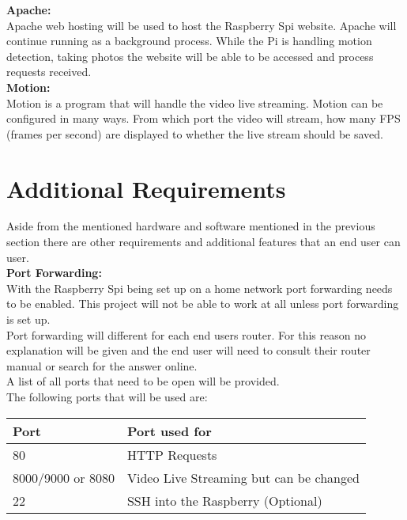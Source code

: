 \documentclass[]{report}
\begin{document}
\noindent
{\bf Apache:}\\
\break
Apache web hosting will be used to host the Raspberry Spi website. Apache will continue running as a background process. While the Pi is handling motion detection, taking photos the website will be able to be accessed and process requests received.\\ 

\noindent
{\bf Motion:}\\
\break
Motion is a program that will handle the video live streaming. Motion can be configured in many ways. From which port the video will stream, how many FPS (frames per second) are displayed to whether the live stream should be saved.\\

\clearpage
\section{Additional Requirements}	
\label{sec:additional}
Aside from the mentioned hardware and software mentioned in the previous section there are other requirements and additional features that an end user can user.\\

\noindent
{\bf Port Forwarding:}\\
\break
With the Raspberry Spi being set up on a home network port forwarding needs to be enabled. This project will not be able to work at all unless port forwarding is set up.\\

Port forwarding will different for each end users router. For this reason no explanation will be given and the end user will need to consult their router manual or search for the answer online. \\

A list of all ports that need to be open will be provided. \\

The following ports that will be used are:

\begin{center}
    \begin{tabular}{ | l | p{7cm} |}
    \hline
    {\bf Port} & {\bf Port used for} \\ \hline
   80 & HTTP Requests \\ \hline 
   8000/9000 or 8080 & Video Live Streaming but can be changed\\ \hline
	22 & SSH into the Raspberry (Optional) \\ \hline
    \end{tabular}
    \\[0.5cm]
\end{center} 
\end{document}
